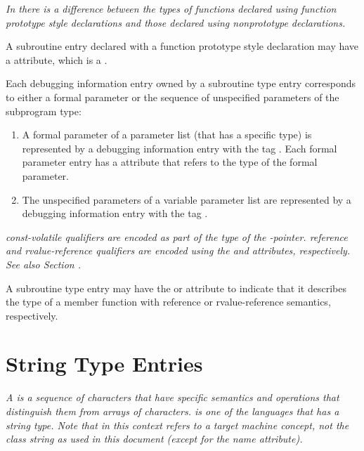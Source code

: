 \textit{In  there 
is a difference between the types of functions
declared using function prototype style declarations and
those declared using non\dash prototype declarations.}

A 
\hypertarget{chap:DWATprototypedsubroutineprototype}{}
subroutine entry declared with a function prototype style
declaration may have 
a 
\DWATprototyped{} attribute, which is
a .

Each debugging information entry owned by a subroutine
type entry corresponds to either a formal parameter or the sequence of
unspecified parameters of the subprogram type:

\begin{enumerate}[1. ]
\item A formal parameter of a parameter list (that has a
specific type) is represented by a debugging information entry
with the tag \DWTAGformalparameter. 
Each formal parameter
entry has 
a \DWATtype{} attribute that refers to the type of
the formal parameter.

\item The unspecified parameters of a variable parameter list
are 
represented by a debugging information entry with the
tag \DWTAGunspecifiedparameters.
\end{enumerate}

\textit{ const-volatile qualifiers are encoded as 
part of the type of the
-pointer. 
 reference and rvalue-reference qualifiers are encoded using
the \DWATreference{} and \DWATrvaluereference{} attributes, respectively. 
See also Section .}

A subroutine type entry may have the \DWATreference{} or
\DWATrvaluereference{} attribute to indicate that it describes the
type of a member function with reference or rvalue-reference 
semantics, respectively.

\section{String Type Entries}
\label{chap:stringtypeentries}

\textit{A  is a sequence of characters that have specific
semantics and operations that distinguish them from arrays of
characters. 
 is one of the languages that has a string
type. Note that  in this context refers to a target
machine concept, not the class string as used in this document
(except for the name attribute).}

